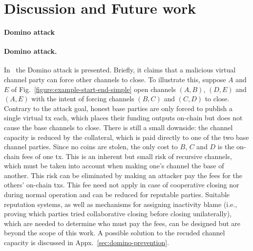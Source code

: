 \section{Discussion and Future work}
\label{sec:future-work}
\makeatletter%
%
  {\paragraph{Domino attack}}%
  {\paragraph{Domino attack.}}%
\makeatother%
In~\cite{donner} the Domino attack is presented. Briefly, it claims that a
malicious virtual channel party can force other channels to close. To
illustrate this, suppose $A$ and $E$ of
Fig.~\ref{figure:example-start-end-simple} open
channels
$(A, B)$, $(D, E)$ and $(A, E)$ with the intent of forcing channels $(B,
C)$ and $(C, D)$ to close. Contrary to the attack goal, honest
base parties are only
forced to publish a single virtual tx each, which places their funding
outputs on-chain but does not cause the base channels to close. There is still a
small downside:
the channel capacity is reduced by the collateral, which
is paid directly to one of the two base channel parties. Since no coins are
stolen, the only cost to $B$, $C$ and $D$ is the on-chain fees
of one tx. This is an inherent but small risk of
recursive channels, which must be taken into account when making one's
channel the base of another. This risk can be eliminated by making an attacker
pay the fees for the others' on-chain txs. This fee need not apply in
case of cooperative closing nor
during normal operation and can be reduced for reputable parties.
Suitable reputation systems, as well as mechanisms for assigning inactivity
blame (i.e., proving which parties tried collaborative closing before
closing unilaterally), which are needed to determine who must pay the fees,
can be designed but are beyond the scope of this work.
A possible solution to
the recuded channel capacity is discussed in Appx.~\ref{sec:domino-prevention}.

